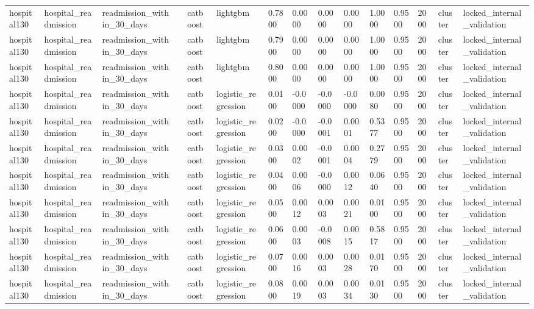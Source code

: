 \begin{tabular}{lllllllllllllll}
hospital130 & hospital\_readmission & readmission\_within\_30\_days &  & catboost & lightgbm & 0.7800 & 0.0000 & 0.0000 & 0.0000 & 1.0000 & 0.9500 & 2000 & cluster & locked\_internal\_validation \\
hospital130 & hospital\_readmission & readmission\_within\_30\_days &  & catboost & lightgbm & 0.7900 & 0.0000 & 0.0000 & 0.0000 & 1.0000 & 0.9500 & 2000 & cluster & locked\_internal\_validation \\
hospital130 & hospital\_readmission & readmission\_within\_30\_days &  & catboost & lightgbm & 0.8000 & 0.0000 & 0.0000 & 0.0000 & 1.0000 & 0.9500 & 2000 & cluster & locked\_internal\_validation \\
hospital130 & hospital\_readmission & readmission\_within\_30\_days &  & catboost & logistic\_regression & 0.0100 & -0.0000 & -0.0000 & -0.0000 & 0.0080 & 0.9500 & 2000 & cluster & locked\_internal\_validation \\
hospital130 & hospital\_readmission & readmission\_within\_30\_days &  & catboost & logistic\_regression & 0.0200 & -0.0000 & -0.0001 & 0.0001 & 0.5377 & 0.9500 & 2000 & cluster & locked\_internal\_validation \\
hospital130 & hospital\_readmission & readmission\_within\_30\_days &  & catboost & logistic\_regression & 0.0300 & 0.0002 & -0.0001 & 0.0004 & 0.2779 & 0.9500 & 2000 & cluster & locked\_internal\_validation \\
hospital130 & hospital\_readmission & readmission\_within\_30\_days &  & catboost & logistic\_regression & 0.0400 & 0.0006 & -0.0000 & 0.0012 & 0.0640 & 0.9500 & 2000 & cluster & locked\_internal\_validation \\
hospital130 & hospital\_readmission & readmission\_within\_30\_days &  & catboost & logistic\_regression & 0.0500 & 0.0012 & 0.0003 & 0.0021 & 0.0100 & 0.9500 & 2000 & cluster & locked\_internal\_validation \\
hospital130 & hospital\_readmission & readmission\_within\_30\_days &  & catboost & logistic\_regression & 0.0600 & 0.0003 & -0.0008 & 0.0015 & 0.5817 & 0.9500 & 2000 & cluster & locked\_internal\_validation \\
hospital130 & hospital\_readmission & readmission\_within\_30\_days &  & catboost & logistic\_regression & 0.0700 & 0.0016 & 0.0003 & 0.0028 & 0.0170 & 0.9500 & 2000 & cluster & locked\_internal\_validation \\
hospital130 & hospital\_readmission & readmission\_within\_30\_days &  & catboost & logistic\_regression & 0.0800 & 0.0019 & 0.0003 & 0.0034 & 0.0130 & 0.9500 & 2000 & cluster & locked\_internal\_validation \\

\end{tabular}
